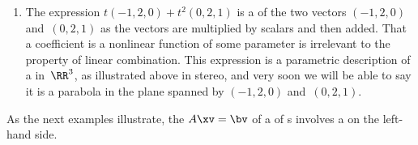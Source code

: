 \begin{example}
\begin{enumerate}
\item 
\begin{figbox}{ {}}%
The expression \(t(-1,2,0)+t^2(0,2,1)\)
is a  of the two vectors \((-1,2,0)\) 
and~\((0,2,1)\) as the vectors are multiplied by scalars and then added.  
That a coefficient is a nonlinear function of some parameter is irrelevant to the property of linear combination.
This expression is a parametric description of a  in~\(\RR^3\), as illustrated above in stereo, and very soon we will be able to say it is a parabola in the plane spanned by \((-1,2,0)\) and~\((0,2,1)\).
\end{figbox}

\end{enumerate}
\end{example}



As the next examples illustrate, the  \(A\xv=\bv\) of a  of s involves a  on the left-hand side.

